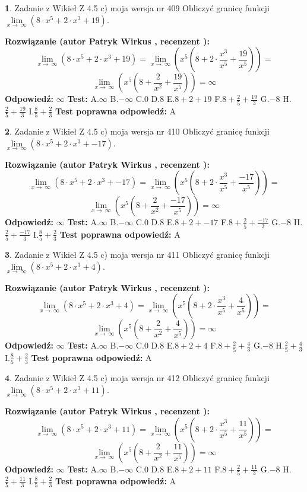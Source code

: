 \documentclass[12pt, a4paper]{article}
\theoremstyle{definition} %
\newtheorem{zad}{}
\newcommand{\zadStart}[1]{\begin{zad}#1\newline}
\newcommand{\zadStop}{\end{zad}}
\newcommand{\rozwStart}[2]{\noindent \textbf{Rozwiązanie (autor #1 , recenzent #2): }\newline}
\newcommand{\rozwStop}{\newline}
\newcommand{\odpStart}{\noindent \textbf{Odpowiedź:}\newline}
\newcommand{\odpStop}{\newline}
\newcommand{\testStart}{\noindent \textbf{Test:}\newline}
\newcommand{\testStop}{\newline}
\newcommand{\kluczStart}{\noindent \textbf{Test poprawna odpowiedź:}\newline}
\newcommand{\kluczStop}{\newline}
\begin{document}
\zadStart{Zadanie z Wikieł Z 4.5 c) moja wersja nr 409}
Obliczyć granicę funkcji  $\lim\limits_{x\to\ \infty}(8 \cdot x^{5}+2 \cdot x^{3}+19)$.
\zadStop
\rozwStart{Patryk Wirkus}{}
$$\lim\limits_{x\to\ \infty}(8 \cdot x^{5}+2 \cdot x^{3}+19) = \lim\limits_{x\to\ \infty}(x^{5}(8 +2 \cdot \frac{x^{3}}{x^{5}}+\frac{19}{x^{5}})) =$$ $$\lim\limits_{x\to\ \infty}(x^{5}(8 +\frac{2}{x^{2}}+\frac{19}{x^{5}})) =\infty$$
\rozwStop
\odpStart
$\infty$
\odpStop
\testStart
A.$\infty$ B.$-\infty$ C.$0$ D.$8$ E.$8 + 2 + 19$
F.$8+\frac{2}{5}+\frac{19}{3}$ G.$-8$
H.$\frac{2}{5}+\frac{19}{3}$
I.$\frac{8}{5}+\frac{2}{3}$
\testStop
\kluczStart
A
\kluczStop



\zadStart{Zadanie z Wikieł Z 4.5 c) moja wersja nr 410}
Obliczyć granicę funkcji  $\lim\limits_{x\to\ \infty}(8 \cdot x^{5}+2 \cdot x^{3}+-17)$.
\zadStop
\rozwStart{Patryk Wirkus}{}
$$\lim\limits_{x\to\ \infty}(8 \cdot x^{5}+2 \cdot x^{3}+-17) = \lim\limits_{x\to\ \infty}(x^{5}(8 +2 \cdot \frac{x^{3}}{x^{5}}+\frac{-17}{x^{5}})) =$$ $$\lim\limits_{x\to\ \infty}(x^{5}(8 +\frac{2}{x^{2}}+\frac{-17}{x^{5}})) =\infty$$
\rozwStop
\odpStart
$\infty$
\odpStop
\testStart
A.$\infty$ B.$-\infty$ C.$0$ D.$8$ E.$8 + 2 + -17$
F.$8+\frac{2}{5}+\frac{-17}{3}$ G.$-8$
H.$\frac{2}{5}+\frac{-17}{3}$
I.$\frac{8}{5}+\frac{2}{3}$
\testStop
\kluczStart
A
\kluczStop



\zadStart{Zadanie z Wikieł Z 4.5 c) moja wersja nr 411}
Obliczyć granicę funkcji  $\lim\limits_{x\to\ \infty}(8 \cdot x^{5}+2 \cdot x^{3}+4)$.
\zadStop
\rozwStart{Patryk Wirkus}{}
$$\lim\limits_{x\to\ \infty}(8 \cdot x^{5}+2 \cdot x^{3}+4) = \lim\limits_{x\to\ \infty}(x^{5}(8 +2 \cdot \frac{x^{3}}{x^{5}}+\frac{4}{x^{5}})) =$$ $$\lim\limits_{x\to\ \infty}(x^{5}(8 +\frac{2}{x^{2}}+\frac{4}{x^{5}})) =\infty$$
\rozwStop
\odpStart
$\infty$
\odpStop
\testStart
A.$\infty$ B.$-\infty$ C.$0$ D.$8$ E.$8 + 2 + 4$
F.$8+\frac{2}{5}+\frac{4}{3}$ G.$-8$
H.$\frac{2}{5}+\frac{4}{3}$
I.$\frac{8}{5}+\frac{2}{3}$
\testStop
\kluczStart
A
\kluczStop



\zadStart{Zadanie z Wikieł Z 4.5 c) moja wersja nr 412}
Obliczyć granicę funkcji  $\lim\limits_{x\to\ \infty}(8 \cdot x^{5}+2 \cdot x^{3}+11)$.
\zadStop
\rozwStart{Patryk Wirkus}{}
$$\lim\limits_{x\to\ \infty}(8 \cdot x^{5}+2 \cdot x^{3}+11) = \lim\limits_{x\to\ \infty}(x^{5}(8 +2 \cdot \frac{x^{3}}{x^{5}}+\frac{11}{x^{5}})) =$$ $$\lim\limits_{x\to\ \infty}(x^{5}(8 +\frac{2}{x^{2}}+\frac{11}{x^{5}})) =\infty$$
\rozwStop
\odpStart
$\infty$
\odpStop
\testStart
A.$\infty$ B.$-\infty$ C.$0$ D.$8$ E.$8 + 2 + 11$
F.$8+\frac{2}{5}+\frac{11}{3}$ G.$-8$
H.$\frac{2}{5}+\frac{11}{3}$
I.$\frac{8}{5}+\frac{2}{3}$
\testStop
\kluczStart
A
\kluczStop
\end{document}
